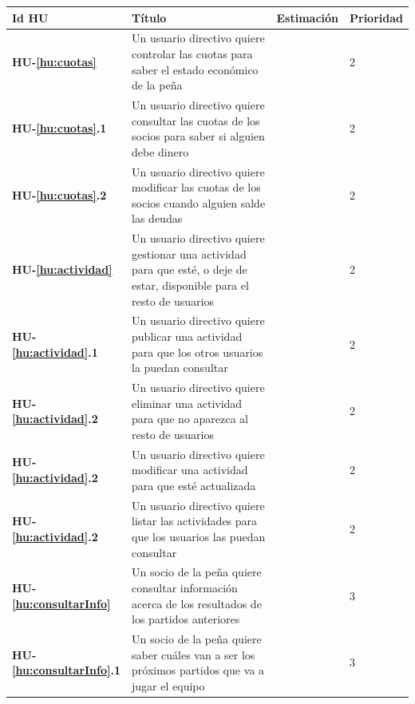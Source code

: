 \documentclass[11pt]{article}
\begin{document}
\begin{table}[H]
  \centering
  \begin{tabular}{p{0.12\linewidth}p{0.6\linewidth}p{0.15\linewidth}p{0.15\linewidth}}
    \toprule
    \textbf{Id HU} & \textbf{Título} & \textbf{Estimación} & \textbf{Prioridad}\\
    \midrule
    \textbf{HU-\ref{hu:cuotas}} & Un usuario directivo quiere controlar las cuotas para saber el estado económico de la peña & & 2\\
	\textbf{HU-\ref{hu:cuotas}.1} & Un usuario directivo quiere consultar las cuotas de los socios para saber si alguien debe dinero & & 2\\
	\textbf{HU-\ref{hu:cuotas}.2} & Un usuario directivo quiere modificar las cuotas de los socios cuando alguien salde las deudas & & 2\\
	
	\midrule
	\textbf{HU-\ref{hu:actividad}} & Un usuario directivo quiere gestionar una actividad para que esté, o deje de estar, disponible para el resto de usuarios & & 2\\
	\textbf{HU-\ref{hu:actividad}.1} & Un usuario directivo quiere publicar una actividad para que los otros usuarios la puedan consultar & & 2\\
	\textbf{HU-\ref{hu:actividad}.2} & Un usuario directivo quiere eliminar una actividad para que no aparezca al resto de usuarios & & 2\\
        \textbf{HU-\ref{hu:actividad}.2} & Un usuario directivo quiere modificar una actividad para que esté actualizada & & 2\\
        \textbf{HU-\ref{hu:actividad}.2} & Un usuario directivo quiere listar las actividades para que los usuarios las puedan consultar & & 2\\
    \midrule
    \textbf{HU-\ref{hu:consultarInfo}} & Un socio de la peña quiere consultar información acerca de los resultados de los partidos anteriores & & 3\\
    \textbf{HU-\ref{hu:consultarInfo}.1} & Un socio de la peña quiere saber cuáles van a ser los próximos partidos que va a jugar el equipo & & 3\\
    \bottomrule
  \end{tabular}
  
\end{table}
\end{document}
